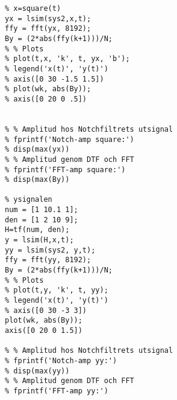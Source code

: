 \begin{lstlisting}
% x=square(t)
yx = lsim(sys2,x,t);
ffy = fft(yx, 8192);
By = (2*abs(ffy(k+1)))/N;
% % Plots
% plot(t,x, 'k', t, yx, 'b');
% legend('x(t)', 'y(t)')
% axis([0 30 -1.5 1.5])
% plot(wk, abs(By));
% axis([0 20 0 .5])


% % Amplitud hos Notchfiltrets utsignal
% fprintf('Notch-amp square:')
% disp(max(yx))
% % Amplitud genom DTF och FFT
% fprintf('FFT-amp square:')
% disp(max(By))

% ysignalen
num = [1 10.1 1];
den = [1 2 10 9];
H=tf(num, den);
y = lsim(H,x,t);
yy = lsim(sys2, y,t);
ffy = fft(yy, 8192);
By = (2*abs(ffy(k+1)))/N;
% % Plots
% plot(t,y, 'k', t, yy);
% legend('x(t)', 'y(t)')
% axis([0 30 -3 3])
plot(wk, abs(By));
axis([0 20 0 1.5])

% % Amplitud hos Notchfiltrets utsignal
% fprintf('Notch-amp yy:')
% disp(max(yy))
% % Amplitud genom DTF och FFT
% fprintf('FFT-amp yy:')
\end{lstlisting}
